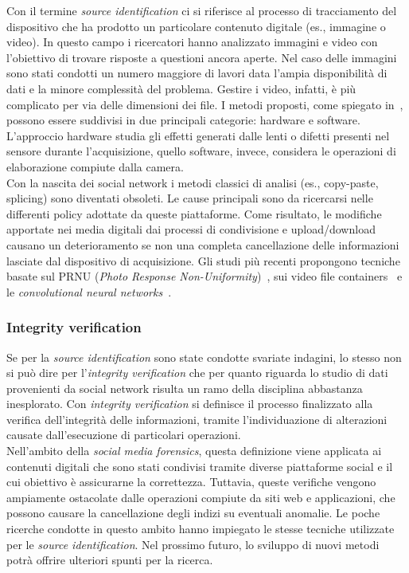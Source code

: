 Con il termine \textit{source identification} ci si riferisce al processo di tracciamento del dispositivo che ha prodotto un particolare contenuto digitale (es., immagine o video). In questo campo i ricercatori hanno analizzato immagini e video con l'obiettivo di trovare risposte a questioni ancora aperte. Nel caso delle immagini sono stati condotti un numero maggiore di lavori data l'ampia disponibilità di dati e la minore complessità del problema. Gestire i video, infatti, è più complicato per via delle dimensioni dei file. I metodi proposti, come spiegato in~\cite{verdoliva}, possono essere suddivisi in due principali categorie: hardware e software. L'approccio hardware studia gli effetti generati dalle lenti o difetti presenti nel sensore durante l'acquisizione, quello software, invece, considera le operazioni di elaborazione compiute dalla camera.\\
Con la nascita dei social network i metodi classici di analisi (es., copy-paste, splicing) sono diventati obsoleti. Le cause principali sono da ricercarsi nelle differenti policy adottate da queste piattaforme. Come risultato, le modifiche apportate nei media digitali dai processi di condivisione e upload/download causano un deterioramento se non una completa cancellazione delle informazioni lasciate dal dispositivo di acquisizione. Gli studi più recenti propongono tecniche basate sul PRNU  (\textit{Photo Response Non-Uniformity})~\cite{bertini2015profile}, sui video file containers~\cite{lopez2020digital} e le \textit{convolutional neural networks}~\cite{rafi2019application}.


\subsubsection{Integrity verification}
\label{sub_sub_sec:integrity_verification}

Se per la \textit{source identification} sono state condotte svariate indagini, lo stesso non si può dire per l'\textit{integrity verification} che per quanto riguarda lo studio di dati provenienti da social network risulta un ramo della disciplina abbastanza inesplorato. Con \textit{integrity verification} si definisce il processo finalizzato alla verifica dell'integrità delle informazioni, tramite l'individuazione di alterazioni causate dall'esecuzione di particolari operazioni.\\
Nell'ambito della \textit{social media forensics}, questa definizione viene applicata ai contenuti digitali che sono stati condivisi tramite diverse piattaforme social e il cui obiettivo è assicurarne la correttezza. Tuttavia, queste verifiche vengono ampiamente ostacolate dalle operazioni compiute da siti web e applicazioni, che possono causare la cancellazione degli indizi su eventuali anomalie. Le poche ricerche condotte in questo ambito hanno impiegato le stesse tecniche utilizzate per le \textit{source identification}. Nel prossimo futuro, lo sviluppo di nuovi metodi potrà offrire ulteriori spunti per la ricerca.


